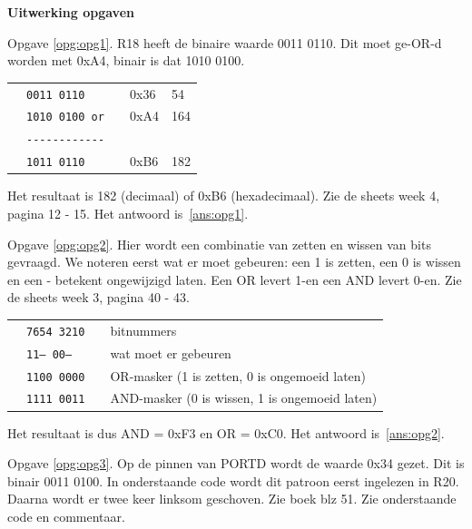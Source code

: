 \documentclass[a4paper,12pt,fleqn,dutch]{tisdexam}
\begin{document}
\begin{questions}

\ifprintanswers
\newpage
\textbf{Uitwerking opgaven}
\vspace{1cm}

Opgave \ref{opg:opg1}. R18 heeft de binaire waarde 0011 0110. Dit moet ge-OR-d worden
met 0xA4, binair is dat 1010 0100.

\begin{table}[h!]
	\begin{tabular}{l l l l l}
		 & \texttt{0011 0110}      &  &  0x36  &  54   \\ 
	 	 & \texttt{1010 0100 or}   &  &  0xA4  &  164  \\ 
		 & \texttt{{-}{-}{-}{-}{-}{-}{-}{-}{-}{-}{-}{-}}  &  &        &       \\ 
		 & \texttt{1011 0110}      &  &  0xB6  &  182  \\
	\end{tabular} 
\end{table}

Het resultaat is 182 (decimaal) of 0xB6 (hexadecimaal). Zie de sheets week 4,
pagina 12 - 15. Het antwoord is~\ref{ans:opg1}.

\vspace{1em}
Opgave \ref{opg:opg2}. Hier wordt een combinatie van zetten en wissen van bits
gevraagd. We noteren eerst wat er moet gebeuren: een 1 is zetten, een 0 is
wissen en een - betekent ongewijzigd laten. Een OR levert 1-en een AND levert
0-en. Zie de sheets week 3, pagina 40 - 43.

\begin{table}[h!]
	\begin{tabular}{l l l l}
		 & \texttt{7654 3210}  &  &  bitnummers   \\ 
	 	 & \texttt{11-- 00--}  &  &  wat moet er gebeuren \\ 
		 & \texttt{1100 0000}  &  &  OR-masker (1 is zetten, 0 is ongemoeid laten)    \\ 
		 & \texttt{1111 0011}  &  &  AND-masker  (0 is wissen, 1 is ongemoeid laten)  \\
	\end{tabular} 
\end{table}

Het resultaat is dus AND = 0xF3 en OR = 0xC0. Het antwoord is~\ref{ans:opg2}.

\vspace{1em}
Opgave \ref{opg:opg3}. Op de pinnen van PORTD wordt de waarde 0x34 gezet. Dit is
binair 0011 0100. In onderstaande code wordt dit patroon eerst ingelezen in
R20. Daarna wordt er twee keer linksom geschoven. Zie boek blz 51. Zie
onderstaande code en commentaar.


\end{questions}
\end{document}
